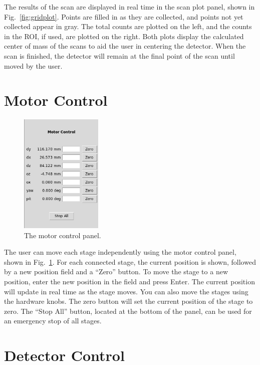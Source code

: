 The results of the scan are displayed in real time in the scan plot panel, shown in Fig.~\ref{fig:gridplot}. Points are filled in as they are collected, and points not yet collected appear in gray. The total counts are plotted on the left, and the counts in the ROI, if used, are plotted on the right.  Both plots display the calculated center of mass of the scans to aid the user in centering the detector. When the scan is finished, the detector will remain at the final point of the scan until moved by the user.

\section{Motor Control}

\begin{figure}
\centering
\includegraphics[width=0.35\textwidth]{motorctl.png}
\caption{\label{fig:motorctl} The motor control panel.}
\end{figure}

The user can move each stage independently using the motor control panel, shown in Fig.~\ref{fig:motorctl}. For each connected stage, the current position is shown, followed by a new position field and a ``Zero'' button. To move the stage to a new position, enter the new position in the field and press Enter. The current position will update in real time as the stage moves. You can also move the stages using the hardware knobs. The zero button will set the current position of the stage to zero. The ``Stop All'' button, located at the bottom of the panel, can be used for an emergency stop of all stages.


\section{Detector Control}

